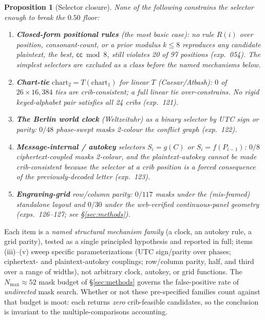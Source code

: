 \documentclass[11pt]{article}
\theoremstyle{plain}
\newtheorem{proposition}{Proposition}
\theoremstyle{definition}
\begin{document}
\begin{proposition}[Selector closure]\label{prop:selclose}
None of the following constrains the selector enough to break the $0.50$ floor:
\begin{enumerate}[leftmargin=1.6em,itemsep=1pt,label=(\roman*)]
\item \textbf{Closed-form positional rules} (the most basic case): no rule
$R(i)$ over position, consonant-count, or a prior modulus $k\le8$ reproduces any
candidate plaintext, the best, $\textsf{cc}\bmod 8$, still violates 20 of 97
positions (exp.~054). The simplest selectors are excluded \emph{as a class} before
the named mechanisms below.
\item \textbf{Chart-tie} $\mathrm{chart}_2=T(\mathrm{chart}_1)$ for linear $T$
(Caesar/Atbash): $0$ of $26\times16{,}384$ ties are crib-consistent; a full linear
tie over-constrains. No rigid keyed-alphabet pair satisfies all 24 cribs (exp.~121).
\item \textbf{The Berlin world clock} (Weltzeituhr) as a binary selector by UTC sign
or parity: $0/48$ phase-swept masks 2-colour the conflict graph (exp.~122).
\item \textbf{Message-internal / autokey} selectors $S_i=g(C)$ or $S_i=f(P_{i-1})$:
$0/8$ ciphertext-coupled masks 2-colour, and the plaintext-autokey cannot be made
crib-consistent because the selector at a crib position is a forced consequence of
the previously-decoded letter (exp.~123).
\item \textbf{Engraving-grid} row/column parity: $0/117$ masks under the (mis-framed)
standalone layout and $0/30$ under the web-verified continuous-panel geometry
(exps.~126--127; see \S\ref{sec:methods}).
\end{enumerate}
\end{proposition}

\noindent
Each item is a \emph{named structural mechanism family} (a clock, an autokey rule, a
grid parity), tested as a single principled hypothesis and reported in full; items
(iii)--(v) sweep specific parameterizations (UTC sign/parity over phases; ciphertext-
and plaintext-autokey couplings; row/column parity, half, and third over a range of
widths), not arbitrary clock, autokey, or grid functions. The $N_{\max}\approx52$
mask budget of \S\ref{sec:methods} governs the false-positive rate of
\emph{undirected} mask search. Whether or not these pre-specified families count
against that budget is moot: each returns \emph{zero} crib-feasible candidates, so the
conclusion is invariant to the multiple-comparisons accounting.
\end{document}
